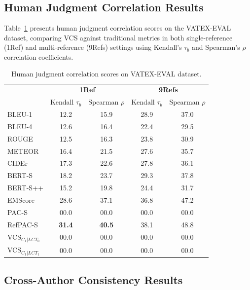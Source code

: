 \documentclass[letterpaper]{article} %
\begin{document}
\subsection{Human Judgment Correlation Results}

Table~\ref{tab:vatex-eval} presents human judgment correlation scores on the VATEX-EVAL dataset, comparing VCS against traditional metrics in both single-reference (1Ref) and multi-reference (9Refs) settings using Kendall's $\tau_b$ and Spearman's $\rho$ correlation coefficients.

\begin{table}[t]
  \centering
  \normalsize
  \setlength{\tabcolsep}{0.75mm}
  \begin{tabular}{l@{\hspace{0.1mm}}cccc}
    \hline
    & \multicolumn{2}{c}{\textbf{1Ref}} & \multicolumn{2}{c}{\textbf{9Refs}} \\
    \cline{2-3} \cline{4-5}
    & Kendall $\tau_b$ & Spearman $\rho$ & Kendall $\tau_b$ & Spearman $\rho$ \\
    \hline
    BLEU-1 & 12.2 & 15.9 & 28.9 & 37.0 \\
    BLEU-4 & 12.6 & 16.4 & 22.4 & 29.5 \\
    ROUGE & 12.5 & 16.3 & 23.8 & 30.9 \\
    METEOR & 16.4 & 21.5 & 27.6 & 35.7 \\
    CIDEr & 17.3 & 22.6 & 27.8 & 36.1 \\
    \hline
    BERT-S & 18.2 & 23.7 & 29.3 & 37.8 \\
    BERT-S++ & 15.2 & 19.8 & 24.4 & 31.7 \\
    \hline
    EMScore & 28.6 & 37.1 & 36.8 & 47.2 \\
    PAC-S & 00.0 & 00.0 & 00.0 & 00.0 \\
    RefPAC-S & \textbf{31.4} & \textbf{40.5} & 38.1 & 48.8 \\
    \hline
    VCS$_{C_1|LCT_0}$ & 00.0 & 00.0 & 00.0 & 00.0 \\
    VCS$_{C_1|LCT_1}$ & 00.0 & 00.0 & 00.0 & 00.0 \\
    \hline
  \end{tabular}
  \caption{Human judgment correlation scores on VATEX-EVAL dataset.}
  \label{tab:vatex-eval}
\end{table}

\subsection{Cross-Author Consistency Results}
\end{document}
